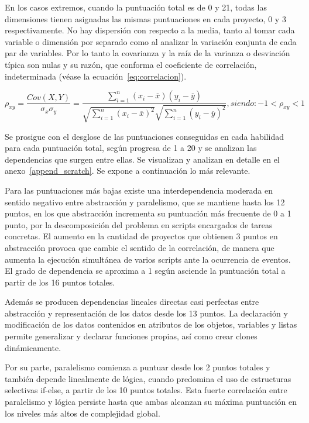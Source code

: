 \documentclass[a4paper, 12pt]{book}
\begin{document}
En los casos extremos, cuando la puntuación total es de 0 y 21, todas las dimensiones tienen asignadas las mismas puntuaciones en cada proyecto, 0 y 3 respectivamente. No hay dispersión con respecto a la media, tanto al tomar cada variable o dimensión por separado como al analizar la variación conjunta de cada par de variables. Por lo tanto la covarianza y la raíz de la varianza o desviación típica son nulas y su razón, que conforma el coeficiente de correlación, indeterminada (véase la ecuación~\eqref{eq:correlacion}). 

\begin{equation}
   \rho_{xy} = \dfrac{Cov(X,Y)}{\sigma_{x}\sigma_{y}} = \dfrac{\sum_{i=1}^{n} (x_i - \overline{x})(y_i - \overline{y})}{\sqrt{\sum_{i=1}^{n} (x_i - \overline{x})^{2}}\sqrt{\sum_{i=1}^{n} (y_i - \overline{y})^{2}}},  siendo: -1<\rho_{xy}<1
   \label{eq:correlacion}
\end{equation}   

Se prosigue con el desglose de las puntuaciones conseguidas en cada habilidad para cada puntuación total, según progresa de 1 a 20 y se analizan las dependencias que surgen entre ellas. 
Se visualizan y analizan en detalle en el anexo~\ref{append_scratch}. Se expone a continuación lo más relevante.

Para las puntuaciones más bajas existe una interdependencia moderada en sentido negativo entre abstracción y paralelismo, que se  mantiene hasta los 12 puntos, en los que abstracción incrementa su puntuación más frecuente de 0 a 1 punto, por la descomposición del problema en scripts encargados de tareas concretas. El aumento en la cantidad de proyectos que obtienen 3 puntos en abstracción provoca que cambie el sentido de la correlación, de manera que aumenta la ejecución simultánea de varios scripts ante la ocurrencia de eventos. El grado de dependencia se aproxima a 1 según asciende la puntuación total a partir de los 16 puntos totales.

Además se producen dependencias lineales directas casi perfectas entre abstracción y representación de los datos desde los 13 puntos. La declaración y modificación de los datos contenidos en atributos de los objetos, variables y listas permite generalizar y declarar funciones propias, así como crear clones dinámicamente.

Por su parte, paralelismo comienza a puntuar desde los 2 puntos totales y también depende linealmente de lógica, cuando predomina el uso de estructuras selectivas if-else, a partir de los 10 puntos totales. Esta fuerte correlación  entre paralelismo y lógica persiste hasta que ambas alcanzan su máxima puntuación en los niveles más altos de complejidad global.
\end{document}
